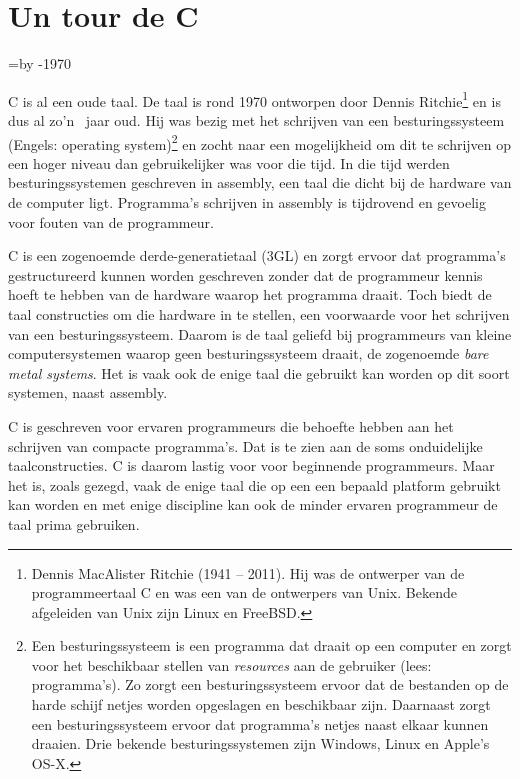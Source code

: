 \chapter{Un tour de C}
\label{cha:tour}
\thispagestyle{empty}

\newcount\cdifference\cdifference=\the\year\advance\cdifference by -1970

C is al een oude taal. De taal is rond 1970 ontworpen door Dennis Ritchie\footnote{Dennis MacAlister Ritchie (1941 -- 2011). Hij was de ontwerper van de programmeertaal C en was een van de ontwerpers van Unix. Bekende afgeleiden van Unix zijn Linux en FreeBSD.} en is dus al zo'n \the\cdifference\ jaar oud. Hij was bezig met het schrijven van een besturingssysteem (Engels: operating system)\footnote{Een besturingssysteem is een programma dat draait op een computer en zorgt voor het beschikbaar stellen van \textsl{resources} aan de gebruiker (lees: programma's). Zo zorgt een besturingssysteem ervoor dat de bestanden op de harde schijf netjes worden opgeslagen en beschikbaar zijn. Daarnaast zorgt een besturingssysteem ervoor dat programma's netjes naast elkaar kunnen draaien. Drie bekende besturingssystemen zijn Windows, Linux en Apple's OS-X.} en zocht naar een mogelijkheid om dit te schrijven op een hoger niveau dan gebruikelijker was voor die tijd. In die tijd werden besturingssystemen geschreven in assembly, een taal die dicht bij de hardware van de computer ligt. Programma's schrijven in assembly is tijdrovend en gevoelig voor fouten van de programmeur.

C is een zogenoemde derde-generatietaal (3GL) en zorgt ervoor dat programma's gestructureerd kunnen worden geschreven zonder dat de programmeur kennis hoeft te hebben van de hardware waarop het programma draait. Toch biedt de taal constructies om die hardware in te stellen, een voorwaarde voor het schrijven van een besturingssysteem. Daarom is de taal geliefd bij programmeurs van kleine computersystemen waarop geen besturingssysteem draait, de zogenoemde \textsl{bare metal systems}. Het is vaak ook de enige taal die gebruikt kan worden op dit soort systemen, naast assembly.

C is geschreven voor ervaren programmeurs die behoefte hebben aan het schrijven van compacte programma’s. Dat is te zien aan de soms onduidelijke taalconstructies. C is daarom lastig voor voor beginnende programmeurs. Maar het is, zoals gezegd, vaak de enige taal die op een een bepaald platform gebruikt kan worden en met enige discipline kan ook de minder ervaren programmeur de taal prima gebruiken.

